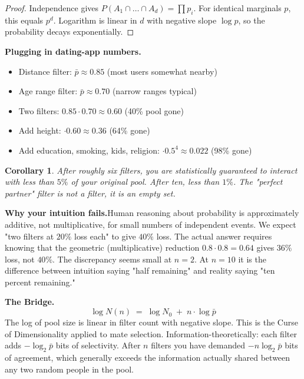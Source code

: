 \documentclass[12pt]{article}
\newtheorem{corollary}{Corollary}
\begin{document}
\begin{proof}
Independence gives $P(A_1 \cap \ldots \cap A_d) = \prod p_i$. For identical marginals $p$, this equals $p^d$. Logarithm is linear in $d$ with negative slope $\log p$, so the probability decays exponentially.
\end{proof}

\bigskip

\medskip\noindent\textbf{Plugging in dating-app numbers.}
\begin{itemize}
\setlength{\itemsep}{0pt}
\item Distance filter: $\bar{p} \approx 0.85$ (most users somewhat nearby)
\item Age range filter: $\bar{p} \approx 0.70$ (narrow ranges typical)
\item Two filters: $0.85 \cdot 0.70 \approx 0.60$ \quad(40\% pool gone)
\item Add height: $\cdot 0.60 \approx 0.36$ \quad(64\% gone)
\item Add education, smoking, kids, religion: $\cdot 0.5^4 \approx 0.022$ \quad(98\% gone)
\end{itemize}

\begin{corollary}
After roughly six filters, you are statistically guaranteed to interact with less than $5\%$ of your original pool. After ten, less than $1\%$. The "perfect partner" filter is not a filter, it is an empty set.
\end{corollary}

\newpage

\medskip\noindent\textbf{Why your intuition fails.}\quad Human reasoning about probability is approximately additive, not multiplicative, for small numbers of independent events. We expect "two filters at $20\%$ loss each" to give $40\%$ loss. The actual answer requires knowing that the geometric (multiplicative) reduction $0.8 \cdot 0.8 = 0.64$ gives $36\%$ loss, not $40\%$. The discrepancy seems small at $n=2$. At $n=10$ it is the difference between intuition saying "half remaining" and reality saying "ten percent remaining."

\bigskip

\medskip\noindent\textbf{The Bridge.}
\[
\boxed{\;\log N(n) \;=\; \log N_0 \;+\; n \cdot \log \bar{p}\;}
\]
The log of pool size is linear in filter count with negative slope. This is the Curse of Dimensionality applied to mate selection. Information-theoretically: each filter adds $-\log_2 \bar{p}$ bits of selectivity. After $n$ filters you have demanded $-n \log_2 \bar{p}$ bits of agreement, which generally exceeds the information actually shared between any two random people in the pool.
\end{document}
